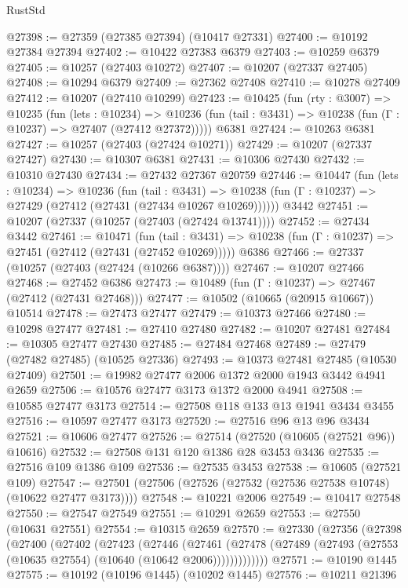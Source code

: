 \begin{lexlean}{RustStd}
\begin{coremodule}
@27398 := @27359 (@27385 @27394) (@10417 @27331)
@27400 := @10192 @27384 @27394
@27402 := @10422 @27383 @6379
@27403 := @10259 @6379
@27405 := @10257 (@27403 @10272)
@27407 := @10207 (@27337 @27405)
@27408 := @10294 @6379
@27409 := @27362 @27408
@27410 := @10278 @27409
@27412 := @10207 (@27410 @10299)
@27423 := @10425
    (fun (rty : @3007) =>
    @10235
      (fun (lets : @10234) =>
      @10236 (fun (tail : @3431) => @10238 (fun (Γ : @10237) => @27407 (@27412 @27372)))))
    @6381
@27424 := @10263 @6381
@27427 := @10257 (@27403 (@27424 @10271))
@27429 := @10207 (@27337 @27427)
@27430 := @10307 @6381
@27431 := @10306 @27430
@27432 := @10310 @27430
@27434 := @27432 @27367 @20759
@27446 := @10447
    (fun (lets : @10234) =>
    @10236
      (fun (tail : @3431) =>
      @10238 (fun (Γ : @10237) => @27429 (@27412 (@27431 (@27434 @10267 @10269))))))
    @3442
@27451 := @10207 (@27337 (@10257 (@27403 (@27424 @13741))))
@27452 := @27434 @3442
@27461 := @10471
    (fun (tail : @3431) => @10238 (fun (Γ : @10237) => @27451 (@27412 (@27431 (@27452 @10269)))))
    @6386
@27466 := @27337 (@10257 (@27403 (@27424 (@10266 @6387))))
@27467 := @10207 @27466
@27468 := @27452 @6386
@27473 := @10489 (fun (Γ : @10237) => @27467 (@27412 (@27431 @27468)))
@27477 := @10502 (@10665 (@20915 @10667)) @10514
@27478 := @27473 @27477
@27479 := @10373 @27466
@27480 := @10298 @27477
@27481 := @27410 @27480
@27482 := @10207 @27481
@27484 := @10305 @27477 @27430
@27485 := @27484 @27468
@27489 := @27479 (@27482 @27485) (@10525 @27336)
@27493 := @10373 @27481 @27485 (@10530 @27409)
@27501 := @19982 @27477 @2006 @1372 @2000 @1943 @3442 @4941 @2659
@27506 := @10576 @27477 @3173 @1372 @2000 @4941
@27508 := @10585 @27477 @3173
@27514 := @27508 @118 @133 @13 @1941 @3434 @3455
@27516 := @10597 @27477 @3173
@27520 := @27516 @96 @13 @96 @3434
@27521 := @10606 @27477
@27526 := @27514 (@27520 (@10605 (@27521 @96)) @10616)
@27532 := @27508 @131 @120 @1386 @28 @3453 @3436
@27535 := @27516 @109 @1386 @109
@27536 := @27535 @3453
@27538 := @10605 (@27521 @109)
@27547 := @27501 (@27506 (@27526 (@27532 (@27536 @27538 @10748) (@10622 @27477 @3173))))
@27548 := @10221 @2006
@27549 := @10417 @27548
@27550 := @27547 @27549
@27551 := @10291 @2659
@27553 := @27550 (@10631 @27551)
@27554 := @10315 @2659
@27570 := @27330
    (@27356
      (@27398
        (@27400
          (@27402
            (@27423
              (@27446
                (@27461
                  (@27478 (@27489 (@27493 (@27553 (@10635 @27554) (@10640 (@10642 @2006)))))))))))))
@27571 := @10190 @1445
@27575 := @10192 (@10196 @1445) (@10202 @1445)
@27576 := @10211 @21396

\end{coremodule}
\end{lexlean}
